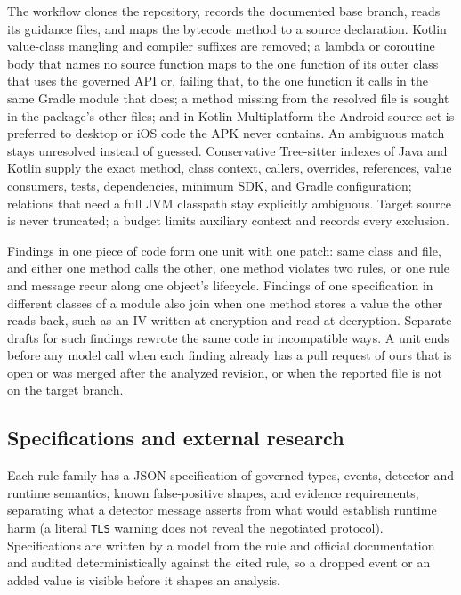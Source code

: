 \documentclass[conference]{IEEEtran}
\begin{document}
The workflow clones the repository, records the documented base branch, reads
its guidance files, and maps the bytecode method to a source declaration.
Kotlin value-class mangling and compiler suffixes are removed; a lambda or
coroutine body that names no source function maps to the one function of its
outer class that uses the governed API or, failing that, to the one function it
calls in the same Gradle module that does; a method missing from the resolved
file is sought in the package's other files; and in Kotlin Multiplatform the
Android source set is preferred to desktop or iOS code the APK never contains.
An ambiguous match stays unresolved instead of guessed. Conservative
Tree-sitter indexes of Java and Kotlin supply the exact method, class context,
callers, overrides, references, value consumers, tests, dependencies, minimum
SDK, and Gradle configuration; relations that need a full JVM classpath stay
explicitly ambiguous. Target source is never truncated; a budget limits
auxiliary context and records every exclusion.

Findings in one piece of code form one unit with one patch: same class and
file, and either one method calls the other, one method violates two rules, or
one rule and message recur along one object's lifecycle. Findings of one
specification in different classes of a module also join when one method
stores a value the other reads back, such as an IV written at encryption and
read at decryption. Separate drafts for such findings rewrote the same code in
incompatible ways. A unit ends before any model call when each finding already
has a pull request of ours that is open or was merged after the analyzed
revision, or when the reported file is not on the target branch.

\subsection{Specifications and external research}

Each rule family has a JSON specification of governed types, events, detector
and runtime semantics, known false-positive shapes, and evidence requirements,
separating what a detector message asserts from what would establish runtime
harm (a literal \texttt{TLS} warning does not reveal the negotiated protocol).
Specifications are written by a model from the rule and official documentation
and audited deterministically against the cited rule, so a dropped event or an
added value is visible before it shapes an analysis.
\end{document}

